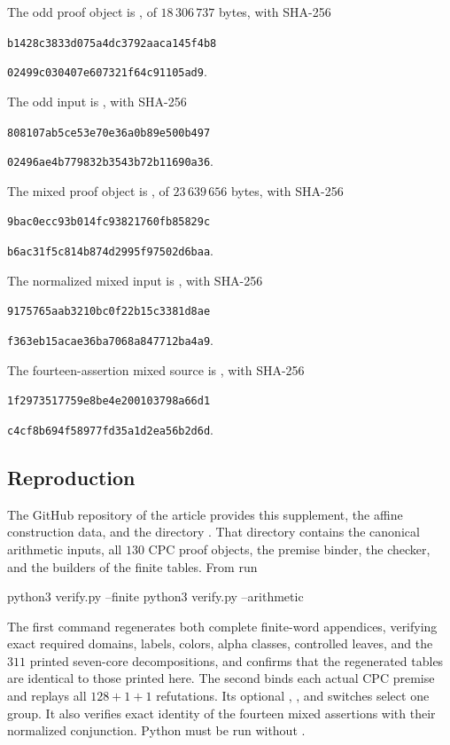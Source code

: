 The odd proof object is , of $18\,306\,737$ bytes, with SHA-256
\begin{center}\small\texttt{b1428c3833d075a4dc3792aaca145f4b8}\par
\texttt{02499c030407e607321f64c91105ad9}.\end{center}
The odd input is , with SHA-256
\begin{center}\small\texttt{808107ab5ce53e70e36a0b89e500b497}\par
\texttt{02496ae4b779832b3543b72b11690a36}.\end{center}
The mixed proof object is , of $23\,639\,656$ bytes, with SHA-256
\begin{center}\small\texttt{9bac0ecc93b014fc93821760fb85829c}\par
\texttt{b6ac31f5c814b874d2995f97502d6baa}.\end{center}
The normalized mixed input is , with SHA-256
\begin{center}\small\texttt{9175765aab3210bc0f22b15c3381d8ae}\par
\texttt{f363eb15acae36ba7068a847712ba4a9}.\end{center}
The fourteen-assertion mixed source is , with SHA-256
\begin{center}\small\texttt{1f2973517759e8be4e200103798a66d1}\par
\texttt{c4cf8b694f58977fd35a1d2ea56b2d6d}.\end{center}

\subsection{Reproduction}
The GitHub repository of the article provides this supplement,
the affine construction data, and the directory . That
directory contains the canonical arithmetic inputs, all $130$ CPC
proof objects, the premise binder, the checker, and the builders of
the finite tables. From  run
\begin{Code}
python3 verify.py --finite
python3 verify.py --arithmetic
\end{Code}
The first command regenerates both complete finite-word appendices, verifying exact required domains, labels, colors, alpha classes, controlled leaves, and the $311$ printed seven-core decompositions, and confirms that the regenerated tables are identical to those printed here. The second binds each actual CPC premise and replays all $128+1+1$ refutations. Its optional , , and  switches select one group. It also verifies exact identity of the fourteen mixed assertions with their normalized conjunction. Python must be run without .

